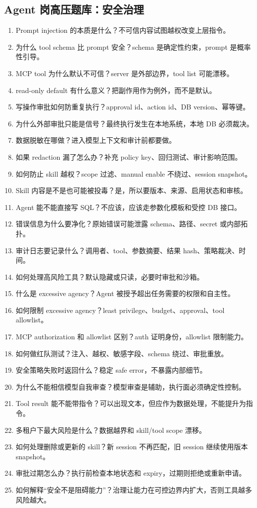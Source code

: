 \subsection{Agent 岗高压题库：安全治理}
\begin{enumerate}[leftmargin=2em]
  \item Prompt injection 的本质是什么？不可信内容试图越权改变上层指令。
  \item 为什么 tool schema 比 prompt 安全？schema 是确定性约束，prompt 是概率性引导。
  \item MCP tool 为什么默认不可信？server 是外部边界，tool list 可能漂移。
  \item read-only default 有什么意义？把副作用作为例外，而不是默认。
  \item 写操作审批如何防重复执行？approval id、action id、DB version、幂等键。
  \item 为什么外部审批只能是信号？最终执行发生在本地系统，本地 DB 必须裁决。
  \item 数据脱敏在哪做？进入模型上下文和审计前都要做。
  \item 如果 redaction 漏了怎么办？补充 policy key、回归测试、审计影响范围。
  \item 如何防止 skill 越权？scope 过滤、manual enable 不绕过、session snapshot。
  \item Skill 内容是不是也可能被投毒？是，所以要版本、来源、启用状态和审核。
  \item Agent 能不能直接写 SQL？不应该，应该走参数化模板和受控 DB 接口。
  \item 错误信息为什么要净化？原始错误可能泄露 schema、路径、secret 或内部拓扑。
  \item 审计日志要记录什么？调用者、tool、参数摘要、结果 hash、策略裁决、时间。
  \item 如何处理高风险工具？默认隐藏或只读，必要时审批和沙箱。
  \item 什么是 excessive agency？Agent 被授予超出任务需要的权限和自主性。
  \item 如何限制 excessive agency？least privilege、budget、approval、tool allowlist。
  \item MCP authorization 和 allowlist 区别？auth 证明身份，allowlist 限制能力。
  \item 如何做红队测试？注入、越权、敏感字段、schema 绕过、审批重放。
  \item 安全策略失败时返回什么？稳定 safe error，不暴露内部细节。
  \item 为什么不能相信模型自我审查？模型审查是辅助，执行面必须确定性控制。
  \item Tool result 能不能带指令？可以出现文本，但应作为数据处理，不能提升为指令。
  \item 多租户下最大风险是什么？数据越界和 skill/tool scope 漂移。
  \item 如何处理删除或更新的 skill？新 session 不再匹配，旧 session 继续使用版本 snapshot。
  \item 审批过期怎么办？执行前检查本地状态和 expiry，过期则拒绝或重新申请。
  \item 如何解释“安全不是阻碍能力”？治理让能力在可控边界内扩大，否则工具越多风险越大。
\end{enumerate}

